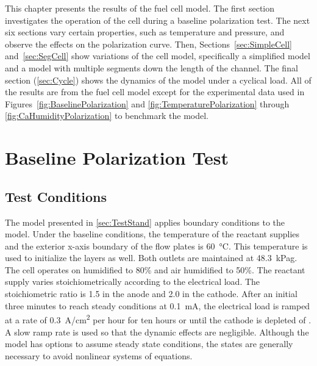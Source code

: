 \glsresetall



This chapter presents the results of the fuel cell model.  The first section investigates the operation of the cell during a baseline polarization test.  The next six sections vary certain properties, such as temperature and pressure, and observe the effects on the polarization curve.  Then, Sections~\ref{sec:SimpleCell} and~\ref{sec:SegCell} show variations of the cell model, specifically a simplified model and a model with multiple segments down the length of the channel.  The final section (\ref{sec:Cycle}) shows the dynamics of the model under a cyclical load.  All of the results are from the fuel cell model except for the experimental data used in Figures~\ref{fig:BaselinePolarization} and \ref{fig:TemperaturePolarization} through \ref{fig:CaHumidityPolarization} to benchmark the model.


\section{Baseline Polarization Test}
\label{sec:Baseline}

\subsection{Test Conditions}
\label{sec:Baseline-Conditions}

The  model presented in \autoref{sec:TestStand} applies boundary conditions to the  model.  Under the baseline conditions, the temperature of the reactant supplies and the exterior x-axis boundary of the flow plates is \SI{60}{\celsius}.  This temperature is used to initialize the layers as well.  Both outlets are maintained at \SI{48.3}{kPag}.  The cell operates on  humidified to 80\% and air humidified to 50\%.  The reactant supply varies stoichiometrically according to the electrical load.  The stoichiometric ratio is 1.5 in the anode and 2.0 in the cathode.  After an initial three minutes to reach steady conditions at \SI{0.1}{mA}, the electrical load is ramped at a rate of \SI{0.3}{A/cm^2} per hour for ten hours or until the cathode is depleted of .  A slow ramp rate is used so that the dynamic effects are negligible.  Although the model has options to assume steady state conditions, the states are generally necessary to avoid nonlinear systems of equations.

